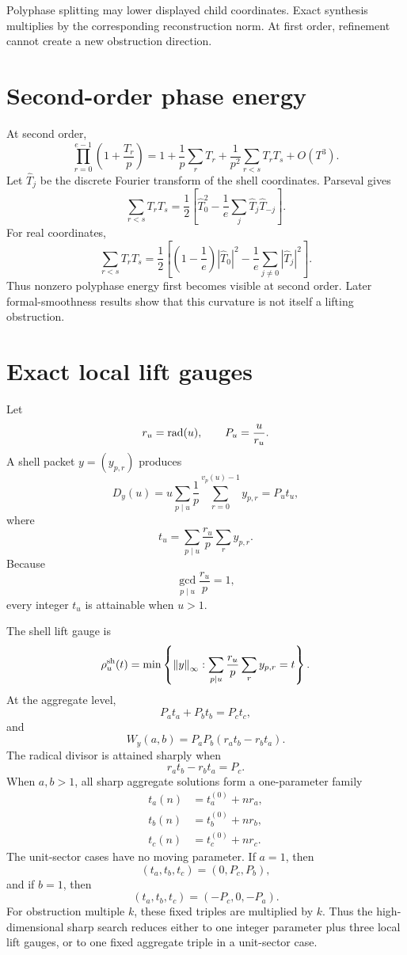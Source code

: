 Polyphase splitting may lower displayed child coordinates. Exact synthesis multiplies by the corresponding reconstruction norm. At first order, refinement cannot create a new obstruction direction.

\section{Second-order phase energy}
At second order,
\[
 \prod_{r=0}^{e-1}
 \left(1+\frac{T_r}{p}\right)
 =
 1+
 \frac1p\sum_rT_r+
 \frac1{p^2}\sum_{r<s}T_rT_s+
 O(T^3).
\]
Let $\widehat T_j$ be the discrete Fourier transform of the shell coordinates. Parseval gives
\[
 \sum_{r<s}T_rT_s
 =
 \frac12\left[
 \widehat T_0^2
 -
 \frac1e\sum_j
 \widehat T_j\widehat T_{-j}
 \right].
\]
For real coordinates,
\[
 \sum_{r<s}T_rT_s
 =
 \frac12\left[
 \left(1-\frac1e\right)|\widehat T_0|^2
 -
 \frac1e\sum_{j\neq0}|\widehat T_j|^2
 \right].
\]
Thus nonzero polyphase energy first becomes visible at second order. Later formal-smoothness results show that this curvature is not itself a lifting obstruction.

\section{Exact local lift gauges}
Let
\[
 r_u=\operatorname{rad}(u),
 \qquad
 P_u=\frac{u}{r_u}.
\]
A shell packet $y=(y_{p,r})$ produces
\[
 D_y(u)
 =
 u\sum_{p\mid u}\frac1p
 \sum_{r=0}^{v_p(u)-1}y_{p,r}
 =P_ut_u,
\]
where
\[
 t_u=
 \sum_{p\mid u}
 \frac{r_u}{p}
 \sum_r y_{p,r}.
\]
Because
\[
 \gcd_{p\mid u}\frac{r_u}{p}=1,
\]
every integer $t_u$ is attainable when $u>1$.

The shell lift gauge is
\[
 \rho_u^{\mathrm{sh}}(t)
 =
 \min\left\{
 \left\lVert y\right\rVert_\infty:
 \sum_{p\mid u}
 \frac{r_u}{p}
 \sum_r y_{p,r}=t
 \right\}.
\]
At the aggregate level,
\[
 P_at_a+P_bt_b=P_ct_c,
\]
and
\[
 W_y(a,b)
 =
 P_aP_b(r_at_b-r_bt_a).
\]
The radical divisor is attained sharply when
\[
 r_at_b-r_bt_a=P_c.
\]
When $a,b>1$, all sharp aggregate solutions form a one-parameter family
\[
 \begin{aligned}
 t_a(n)&=t_a^{(0)}+nr_a,\\
 t_b(n)&=t_b^{(0)}+nr_b,\\
 t_c(n)&=t_c^{(0)}+nr_c.
 \end{aligned}
\]
The unit-sector cases have no moving parameter. If $a=1$, then
\[
 (t_a,t_b,t_c)=(0,P_c,P_b),
\]
and if $b=1$, then
\[
 (t_a,t_b,t_c)=(-P_c,0,-P_a).
\]
For obstruction multiple $k$, these fixed triples are multiplied by $k$. Thus the high-dimensional sharp search reduces either to one integer parameter plus three local lift gauges, or to one fixed aggregate triple in a unit-sector case.


